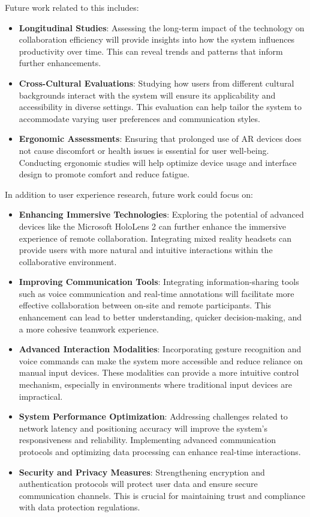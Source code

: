 Future work related to this includes:

\begin{itemize}
    \item \textbf{Longitudinal Studies}: Assessing the long-term impact of the technology on collaboration efficiency will provide insights into how the system influences productivity over time. This can reveal trends and patterns that inform further enhancements.
    \item \textbf{Cross-Cultural Evaluations}: Studying how users from different cultural backgrounds interact with the system will ensure its applicability and accessibility in diverse settings. This evaluation can help tailor the system to accommodate varying user preferences and communication styles.
    \item \textbf{Ergonomic Assessments}: Ensuring that prolonged use of AR devices does not cause discomfort or health issues is essential for user well-being. Conducting ergonomic studies will help optimize device usage and interface design to promote comfort and reduce fatigue.
\end{itemize}

In addition to user experience research, future work could focus on:

\begin{itemize} 
    \item \textbf{Enhancing Immersive Technologies}: Exploring the potential of advanced devices like the Microsoft HoloLens 2 can further enhance the immersive experience of remote collaboration. Integrating mixed reality headsets can provide users with more natural and intuitive interactions within the collaborative environment.
    \item \textbf{Improving Communication Tools}: Integrating information-sharing tools such as voice communication and real-time annotations will facilitate more effective collaboration between on-site and remote participants. This enhancement can lead to better understanding, quicker decision-making, and a more cohesive teamwork experience.
    \item \textbf{Advanced Interaction Modalities}: Incorporating gesture recognition and voice commands can make the system more accessible and reduce reliance on manual input devices. These modalities can provide a more intuitive control mechanism, especially in environments where traditional input devices are impractical.
    \item \textbf{System Performance Optimization}: Addressing challenges related to network latency and positioning accuracy will improve the system's responsiveness and reliability. Implementing advanced communication protocols and optimizing data processing can enhance real-time interactions.
    \item \textbf{Security and Privacy Measures}: Strengthening encryption and authentication protocols will protect user data and ensure secure communication channels. This is crucial for maintaining trust and compliance with data protection regulations.
\end{itemize}

